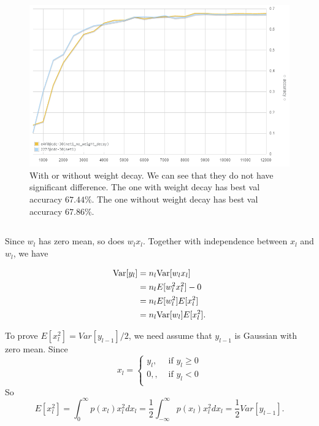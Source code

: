 \begin{figure}[ht]
\centering
    \includegraphics[width=0.9\linewidth]{fig/nodecayacc}
    \caption{\small
    With or without weight decay.
    We can see that they do not have significant difference.
    The one with weight decay has best val accuracy $67.44\%$.
    The one without weight decay has best val accuracy $67.86\%$.}
    \label{fig:3}
\end{figure}


\subsection{} %

Since $w_l$ has zero mean,
so does $w_l x_l$.
Together with independence between $x_l$ and $w_l$,
we have

\begin{equation}
\begin{split}
    {\mathop{\mathrm{Var}}}[y_l] &= n_l {\mathop{\mathrm{Var}}}[w_l x_l] \\
        &=n_l E[w_l^2 x_l^2] - 0 \\
        &=n_l E[w_l^2] E[x_l^2] \\
        &=n_l {\mathop{\mathrm{Var}}}[w_l] E[x_l^2].
\end{split}
\end{equation}

To prove $E[x_l^2]=Var[y_{l-1}]/2$,
we need assume that $y_{l-1}$ is Gaussian with zero mean.
Since
\begin{equation}
    x_l = \begin{cases}
        y_l, &\text{ if }y_l\ge0\\
        0, , &\text{ if }y_l<0\\
    \end{cases}
\end{equation}
So
\begin{equation}
    E[x_l^2] = \int_0^\infty p(x_l)x_l^2 dx_l
        = \frac{1}{2}\int_{-\infty}^\infty p(x_l)x_l^2 dx_l
        = \frac{1}{2}Var[y_{l-1}].
\end{equation}

